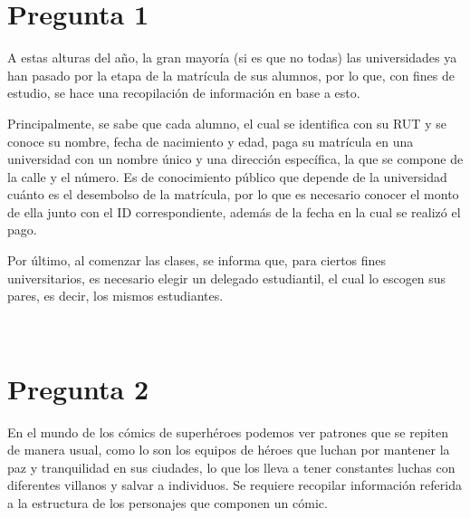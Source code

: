 \documentclass[letterpaper]{article}
\begin{document}
\section{Pregunta 1}

A estas alturas del año, la gran mayoría (si es que no todas) las universidades ya han pasado por la etapa de la matrícula de sus alumnos, por lo que, con fines de estudio, se hace una recopilación de información en base a esto.

Principalmente, se sabe que cada alumno, el cual se identifica con su RUT y se conoce su nombre, fecha de nacimiento y edad,  paga su matrícula en una universidad con un nombre único y una dirección específica, la que se compone de la calle y el número. Es de conocimiento público que depende de la universidad cuánto es el desembolso de la matrícula, por lo que es necesario conocer el monto de ella junto con el ID correspondiente, además de la fecha en la cual se realizó el  pago.

Por último, al comenzar las clases, se informa que, para ciertos fines universitarios, es necesario elegir un delegado estudiantil, el cual lo escogen sus pares, es decir, los mismos estudiantes.
 
 
\section{Pregunta 2}

En el mundo de los cómics de superhéroes podemos ver patrones que se repiten de manera usual, como lo son los equipos de héroes que luchan por mantener la paz y tranquilidad en sus ciudades, lo que los lleva a tener constantes luchas con diferentes villanos y salvar a individuos. Se requiere recopilar información referida a la estructura de los personajes que componen un cómic.
\end{document}
